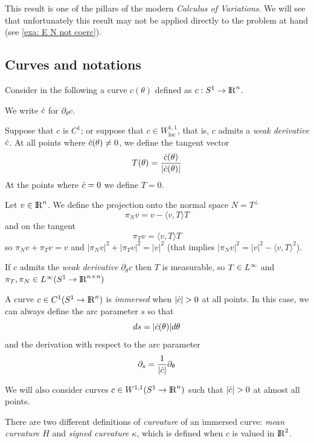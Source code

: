 \documentclass[twoside,a4paper,english]{article}
\def\derpar#1{\partial_{#1}}
\begin{document}
This result is one of the pillars of the modern \emph{Calculus of
Variations}. We will see that unfortunately this result may not be applied
directly to the problem at hand (see \ref{exa: E N not coerc}).

\subsection{Curves and notations}
\label{sec: notation}



Consider in the following a curve $c(\theta)$ 
defined as $c:S^1\to {\protect\mathrm{l\hskip-0.15em R}}^n$.

We write $\overdot c$ for $\derpar \theta c$.


\begin{Definition}\label{def: T e pi T e pi N}
  Suppose that $c$ is $C^1$;  or suppose that $c\in W^{1,1}_\text{loc}$,
  that  is, $c$  admits  a \emph{weak derivative} $\overdot c$.
  At all points where $\overdot c(\theta)\neq 0$, we define the
  tangent vector 
  $$T(\theta)= \frac { \overdot c (\theta)}{| \overdot c (\theta)|}$$
  At the points where $\overdot c=0$ we define $T=0$.

  Let $v\in{\protect\mathrm{l\hskip-0.15em R}}^n$. We define the projection onto the normal
  space $N=T^\perp$
  $$  \pi_N v = v -\langle v , T\rangle T $$
  and on the tangent
  $$  \pi_T v = \langle v , T\rangle T $$
  so $\pi_N v+\pi_T v=v$ and $|\pi_N v|^2+|\pi_T v|^2=|v|^2$
  (that implies $|\pi_N v|^2=|v|^2- \langle v , T\rangle^2$).
\end{Definition}


If $c$ admits the \emph{weak derivative} $\derpar \theta c$
then $T$ is measurable, so $T\in L^\infty$
and $\pi_T, \pi_N\in L^\infty(S^1\to {\protect\mathrm{l\hskip-0.15em R}}^{n\times n})$



\smallskip

A curve $c\in C^{1}(S^1\to {\protect\mathrm{l\hskip-0.15em R}}^n)$
is \emph{immersed} when $|\overdot c|>0$ at  all points.
In this case, we can always define the 
arc parameter $s$ so that
\[ds= |\overdot c(\theta)| d\theta \]
and the derivation with respect to the arc parameter
\[ \derpar s  =\frac 1{|\overdot c|} \derpar \theta\]

We will also consider curves  $c\in W^{1,1}(S^1\to {\protect\mathrm{l\hskip-0.15em R}}^n)$
such that $|\overdot c|>0$ at almost all points.


There are  two different definitions of \emph{curvature} of an immersed curve:
\emph{mean curvature $H$} and \emph{signed curvature $\kappa$}, which is
 defined when $c$ is valued in ${\protect\mathrm{l\hskip-0.15em R}}^2$.
\end{document}
